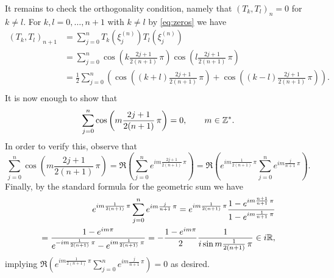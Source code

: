\begin{problem}
\begin{subproblem}[4]
   \begin{solution}
It remains to check the orthogonality condition, namely that $(T_k,T_l)_n=0$ for $k\neq l$. For $k,l=0,\dots,n+1$ with $k\neq l$  by \eqref{eq:zeros}  we have
\begin{equation}\label{eq:norm}
\begin{split}
(T_k,T_l)_{n+1} &= \sum_{j=0}^{n} T_k(\xi_j^{(n)}) T_l(\xi_j^{(n)}) \\
&= \sum_{j=0}^{n} \cos\left(k \frac{2j+1}{2(n+1)}\,\pi\right) \cos\left(l \frac{2j+1}{2(n+1)}\,\pi\right) \\
&=\frac{1}{2} \sum_{j=0}^{n}( \cos\left((k+l) \frac{2j+1}{2(n+1)}\,\pi\right) + \cos\left((k-l) \frac{2j+1}{2(n+1)}\,\pi\right) ).\\
\end{split}
\end{equation}
It is now enough to show that 
\begin{equation}\label{eq:geometric}
\sum_{j=0}^{n} \cos\left(m \frac{2j+1}{2(n+1)}\,\pi\right)=0,\qquad m\in\mathbb{Z}^*.
\end{equation}
In order to verify this, observe that
\[
\sum_{j=0}^{n} \cos \left( m \frac{2j+1}{2(n+1)}\,\pi \right)= 
\Re ( \sum_{j=0}^{n} e^{i m \frac{2j+1}{2(n+1)}\,\pi}  )
= \Re ( e^{i m \frac{1}{2(n+1)}\,\pi} \sum_{j=0}^{n} e^{i m \frac{j}{n+1}\,\pi}  ).
\]
Finally, by the standard formula for the geometric sum we have
\begin{align*}
e^{i m \frac{1}{2(n+1)}\,\pi} \sum_{j=0}^{n} e^{i m \frac{j}{n+1}\,\pi } =e^{i m \frac{1}{2(n+1)}\,\pi}\frac{1-e^{i m \frac{n+1}{n+1}\,\pi} }{1-e^{i m \frac{1}{n+1}\,\pi}} \\
=\frac{1-e^{i m \pi} }{e^{-i m \frac{1}{2(n+1)}\,\pi}-e^{i m \frac{1}{2(n+1)}\,\pi}} = - \frac{1-e^{i m \pi}}{2} \frac{1}{i \sin{m \frac{1}{2(n+1)}\,\pi}} \in i \mathbb{R},
\end{align*}
implying $\Re ( e^{i m \frac{1}{2(n+1)}\,\pi} \sum_{j=0}^{n} e^{i m \frac{j}{n+1}\,\pi}  ) = 0$ as desired.
\end{solution}
\end{subproblem}


\end{problem}
